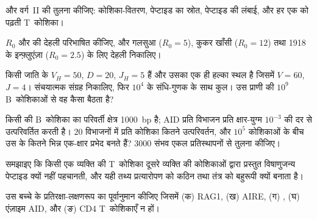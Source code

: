 \begin{exercise}[$\star$]\label{exo:b3:adaptive-immunity:3}
 और वर्ग~II की तुलना कीजिए: कोशिका-वितरण, पेप्टाइड का स्रोत,
पेप्टाइड की लंबाई, और हर एक को पढ़ती T~कोशिका।
\end{exercise}

\begin{exercise}[$\star$]\label{exo:b3:adaptive-immunity:4}
$R_{0}$ और  की देहली परिभाषित कीजिए, और गलसुआ
($R_{0} = 5$), कुकर खाँसी ($R_{0} = 12$) तथा 1918 के इन्फ़्लुएंज़ा
($R_{0} = 2.5$) के लिए देहली निकालिए।
\end{exercise}

\begin{exercise}[$\star\star$]\label{exo:b3:adaptive-immunity:5}
किसी जाति के $V_{H} = 50$, $D = 20$, $J_{H} = 5$ हैं और उसका एक ही
हल्का स्थल है जिसमें $V = 60$, $J = 4$। संचयात्मक संग्रह निकालिए, फिर
$10^{4}$ के संधि-गुणक के साथ कुल। उस प्राणी की $10^{9}$ B~कोशिकाओं से
वह कैसा बैठता है?
\end{exercise}

\begin{exercise}[$\star\star$]\label{exo:b3:adaptive-immunity:6}
किसी  की B~कोशिका का परिवर्ती क्षेत्र \qty{1000}{bp} है; AID
प्रति विभाजन प्रति क्षार-युग्म $10^{-3}$ की दर से उत्परिवर्तित करती
है। $20$ विभाजनों में प्रति कोशिका कितने उत्परिवर्तन, और $10^{5}$
कोशिकाओं के बीच उस  के कितने भिन्न एक-क्षार प्रभेद बनते हैं?
$3000$ संभव एकल प्रतिस्थापनों से तुलना कीजिए।
\end{exercise}

\begin{exercise}[$\star\star$]\label{exo:b3:adaptive-immunity:7}
समझाइए कि किसी एक व्यक्ति की T~कोशिका दूसरे व्यक्ति की कोशिकाओं द्वारा
प्रस्तुत विषाणुजन्य पेप्टाइड क्यों नहीं पहचानती, और यही तथ्य
प्रत्यारोपण को कठिन तथा  तंत्र को बहुरूपी क्यों बनाता है।
\end{exercise}

\begin{exercise}[$\star\star$]\label{exo:b3:adaptive-immunity:8}
उस बच्चे के प्रतिरक्षा-लक्षणरूप का पूर्वानुमान कीजिए जिसमें (क) RAG1,
(ख) AIRE, (ग) , (घ)  एंज़ाइम AID, और (ङ) CD4 T~कोशिकाएँ न हों।
\end{exercise}

